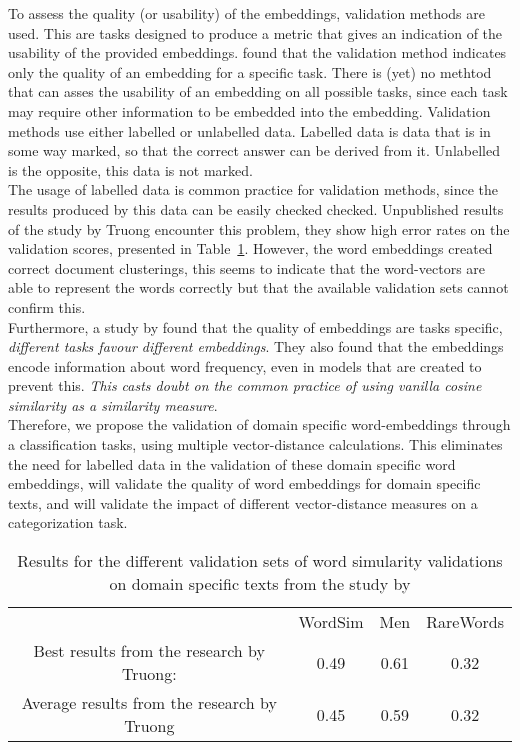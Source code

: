 \documentclass[../../Thesis.tex]{subfiles}
\begin{document}
To assess the quality (or usability) of the embeddings, validation methods are used. This are tasks designed to produce a metric that gives an indication of the usability of the provided embeddings. \citet{schnabel2015evaluation} found that the validation method indicates only the quality of an embedding for a specific task. There is (yet) no methtod that can asses the usability of an embedding on all possible tasks, since each task may require other information to be embedded into the embedding.
Validation methods use either labelled or unlabelled data. Labelled data is data that is in some way marked, so that the correct answer can be derived from it. Unlabelled is the opposite, this data is not marked.\\
The usage of labelled data is common practice for validation methods, since the results produced by this data can be easily checked checked.
Unpublished results of the study by Truong encounter this problem, they show high error rates on the validation scores, presented in Table~\ref{table:truongErrorRates}. However, the word embeddings created correct document clusterings\cite{Truong2017Thesis}, this seems to indicate that the word-vectors are able to represent the words correctly but that the available validation sets cannot confirm this.\\
Furthermore, a study by \citet{schnabel2015evaluation} found that the quality of embeddings are tasks specific, \textit{different tasks favour different embeddings}. They also found that the embeddings encode information about word frequency, even in models that are created to prevent this. \textit{This casts doubt on the common practice of using vanilla cosine similarity as a similarity measure}.\\
Therefore, we propose the validation of domain specific word-embeddings through a classification tasks, using multiple vector-distance calculations. This eliminates the need for labelled data in the validation of these domain specific word embeddings, will validate the quality of word embeddings for domain specific texts, and will validate the impact of different vector-distance measures on a categorization task.
\begin{table}
\begin{center}
\begin{tabular}{c c c c}
&WordSim & Men & RareWords\\
Best results from the research by Truong: & 0.49 & 0.61 & 0.32\\
Average  results from the research by Truong & 0.45 & 0.59 & 0.32\\
\end{tabular}
\end{center}
\caption{Results for the different validation sets of word simularity validations on domain specific texts from the study by \citet{Truong2017Thesis}}\label{table:truongErrorRates}
\end{table}
\end{document}
